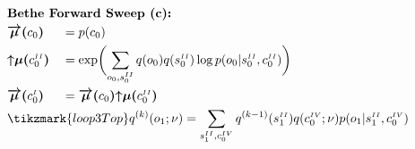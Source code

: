 \documentclass[fleqn]{article}
\begin{document}
\noindent
\begin{alignat}{2}
     & \rlap{\text{\bfseries Bethe Forward Sweep (c):}} \nonumber                                                                                                                                                                                                                                                                                                                                                                                                                                                                   \\
     & \bm{\overrightarrow{\mu}(}c_0\bm{)}                                                                                                                                                                                                                                                                                                                &  & = p(c_0)                                                                                                                                                             \\
     & \bm{{\uparrow}{\mu}(}c^{\scriptscriptstyle II}_0\bm{)}                                                                                                                                                                                                                                                                                             &  & = \exp \biggl( \sum_{o_0,s^{\scriptscriptstyle II}_0} q(o_0)q(s^{\scriptscriptstyle II}_0) \log p(o_0|s^{\scriptscriptstyle II}_0,c^{\scriptscriptstyle II}_0) \biggr) \\
     & \bm{\overrightarrow{\mu}(}c^{\scriptscriptstyle I}_0\bm{)}                                                                                                                                                                                                                                                                                         &  & = \bm{\overrightarrow{\mu}(}c_0\bm{)} \bm{{\uparrow}{\mu}(}c^{\scriptscriptstyle II}_0\bm{)}                                                                         \\
     & \mathrlap{\begin{aligned}[t]
               \tikzmark{loop3Top} q^{(k)}(o_1; \nu)                         & = \sum_{s^{\scriptscriptstyle II}_1,c^{\scriptscriptstyle IV}_0} q^{(k-1)}(s^{\scriptscriptstyle II}_1) q(c^{\scriptscriptstyle IV}_0; \nu) p(o_1|s^{\scriptscriptstyle II}_1,c^{\scriptscriptstyle IV}_0)                                                              \\

\end{aligned}}
\end{alignat}
\end{document}
